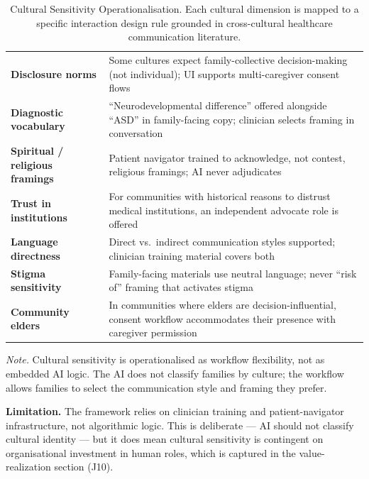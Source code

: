 {\tablestripes\tablefontsize
{}
\begin{xltabular}{\textwidth}{@{} >{\raggedright\arraybackslash}p{3.2cm} L @{}}
\caption[Cultural Sensitivity Operationalisation]{Cultural Sensitivity Operationalisation. Each cultural dimension is mapped to a specific interaction design rule grounded in cross-cultural healthcare communication literature.}\label{tab:appj_culture} \\
\toprule
{} &  \\
\midrule
\endfirsthead
\endhead
\bottomrule
\endlastfoot
\textbf{Disclosure norms}     & Some cultures expect family-collective decision-making (not individual); UI supports multi-caregiver consent flows \\
\textbf{Diagnostic vocabulary} & ``Neurodevelopmental difference'' offered alongside ``ASD'' in family-facing copy; clinician selects framing in conversation \\
\textbf{Spiritual / religious framings} & Patient navigator trained to acknowledge, not contest, religious framings; AI never adjudicates \\
\textbf{Trust in institutions} & For communities with historical reasons to distrust medical institutions, an independent advocate role is offered \\
\textbf{Language directness}  & Direct vs.\ indirect communication styles supported; clinician training material covers both \\
\textbf{Stigma sensitivity}    & Family-facing materials use neutral language; never ``risk of'' framing that activates stigma \\
\textbf{Community elders}     & In communities where elders are decision-influential, consent workflow accommodates their presence with caregiver permission \\
\end{xltabular}}
\vspace{0.4em}
\noindent\textit{Note.} Cultural sensitivity is operationalised as workflow flexibility, not as embedded AI logic. The AI does not classify families by culture; the workflow allows families to select the communication style and framing they prefer.

\noindent\textbf{Limitation.} The framework relies on clinician training and patient-navigator infrastructure, not algorithmic logic. This is deliberate --- AI should not classify cultural identity --- but it does mean cultural sensitivity is contingent on organisational investment in human roles, which is captured in the value-realization section (J10).

